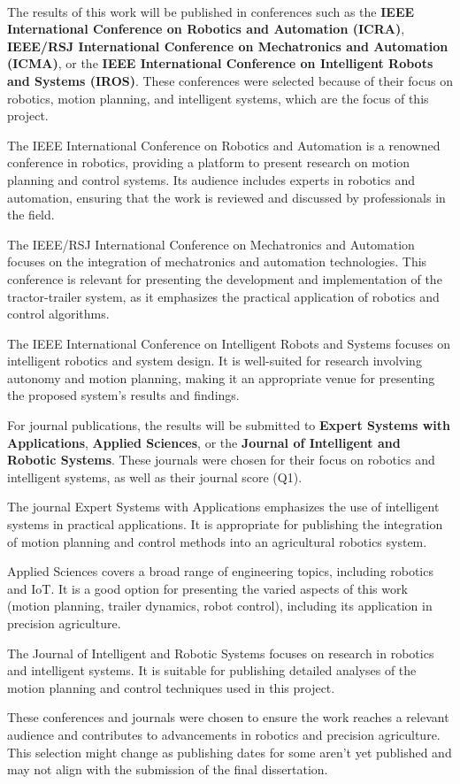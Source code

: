 \paragraph{}The results of this work will be published in conferences such as the \textbf{IEEE International Conference on Robotics 
and Automation (ICRA)}, \textbf{IEEE/RSJ International Conference on Mechatronics and Automation (ICMA)}, or the 
\textbf{IEEE International Conference on Intelligent Robots and Systems (IROS)}. These conferences were 
selected because of their focus on robotics, motion planning, and intelligent systems, which are the focus of this project.

The IEEE International Conference on Robotics and Automation is a renowned conference in robotics, 
providing a platform to present research on motion planning and control systems. Its audience includes experts 
in robotics and automation, ensuring that the work is reviewed and discussed by professionals in the field.

The IEEE/RSJ International Conference on Mechatronics and Automation focuses on the integration of mechatronics 
and automation technologies. This conference is relevant for presenting the development and implementation of the 
tractor-trailer system, as it emphasizes the practical application of robotics and control algorithms.

The IEEE International Conference on Intelligent Robots and Systems focuses on intelligent robotics and system 
design. It is well-suited for research involving autonomy and motion planning, making it an appropriate venue for presenting 
the proposed system’s results and findings.

For journal publications, the results will be submitted to \textbf{Expert Systems with Applications}, \textbf{Applied Sciences}, 
or the \textbf{Journal of Intelligent and Robotic Systems}. These journals were chosen for their focus on robotics and intelligent systems, as 
well as their journal score (Q1).

The journal Expert Systems with Applications emphasizes the use of intelligent systems in practical applications. 
It is appropriate for publishing the integration of motion planning and control methods into an agricultural robotics system.

Applied Sciences covers a broad range of engineering topics, including robotics and IoT. It is a good option 
for presenting the varied aspects of this work (motion planning, trailer dynamics, robot control), including its application in precision 
agriculture.

The Journal of Intelligent and Robotic Systems focuses on research in robotics and intelligent systems. It is suitable 
for publishing detailed analyses of the motion planning and control techniques used in this project.

These conferences and journals were chosen to ensure the work reaches a relevant audience and contributes to advancements 
in robotics and precision agriculture. This selection might change as publishing dates for some aren't yet published and may 
not align with the submission of the final dissertation. 